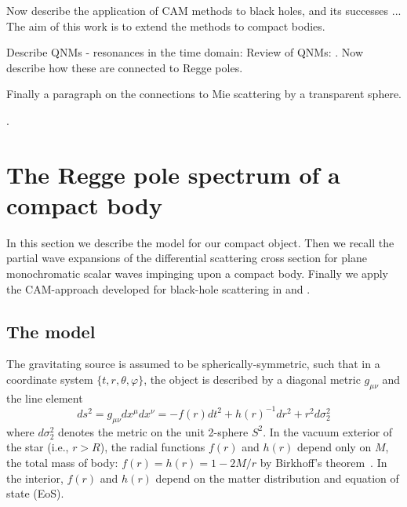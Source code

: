 \documentclass[aps,prd,longbibliography,reprint,twocolumn,amsmath,amssymb,amsfonts,showpacs,superscriptaddress]{revtex4-1}%
\begin{document}
Now describe the application of CAM methods to black holes, and its successes ... The aim of this work is to extend the methods to compact bodies.

Describe QNMs - resonances in the time domain: \cite{Detweiler:1985zz, Kokkotas:1986gd, Chandrasekhar449, Kokkotas:1992ka, Leins:1993zz, Andersson:1995ez, Andersson1996} Review of QNMs: \cite{Kokkotas:1999bd}. Now describe how these are connected to Regge poles.
 
Finally a paragraph on the connections to Mie scattering by a transparent sphere. 

\cite{Leite:2017zyb,Nambu:2019sqn, Folacci:2019vtt,}.  





\section{The Regge pole spectrum of a compact body}
\label{SecII}


In this section we describe the model for our compact object. Then we recall the partial wave expansions of the differential scattering cross section for plane monochromatic scalar waves impinging upon a compact body. Finally we apply the CAM-approach developed for black-hole scattering in \cite{Folacci:2019cmc} and \cite{Folacci:2019vtt}.

\subsection{The model}
\label{SecIIa}

The gravitating source is assumed to be spherically-symmetric, such that in a coordinate system $\{t,r,\theta,\varphi\}$, the object is described by a diagonal metric $g_{\mu \nu}$ and the line element
\begin{equation}\label{Line_elem}
 ds^2 = g_{\mu \nu} dx^\mu dx^\nu = -f(r) dt^2+h(r)^{-1}dr^2+r^2d\sigma_2^2
\end{equation}
where $d\sigma_2^2$ denotes the metric on the unit 2-sphere $S^2$. In the vacuum exterior of the star (i.e., $r>R$), the radial functions $f(r)$ and $h(r)$ depend only on $M$, the total mass of body: $f(r)=h(r)=1-2M/r$ by Birkhoff's theorem~\cite{VojeJohansen:2005nd}. In the interior, $f(r)$ and $h(r)$ depend on the matter distribution and equation of state (EoS). 
\end{document}
